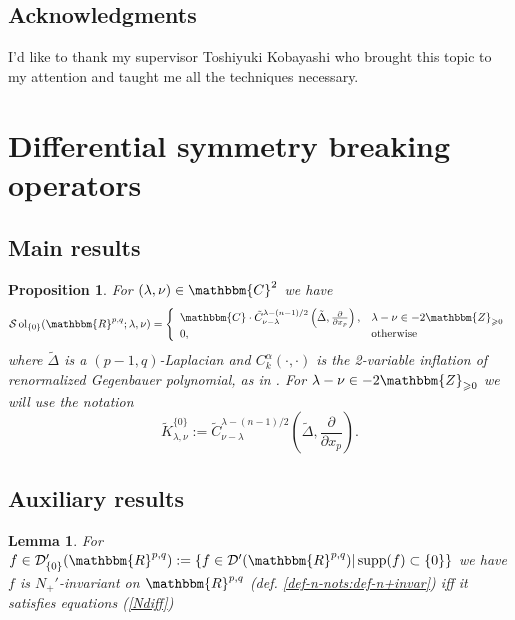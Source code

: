 \documentclass{article}
\newcommand{\assign}{:=}
\newcommand{\tmop}[1]{\ensuremath{\operatorname{#1}}}
\numberwithin{definition}{section}
\newtheorem{lemma}{Lemma}
\numberwithin{lemma}{section}
\newtheorem{proposition}{Proposition}
\numberwithin{proposition}{section}
{\theorembodyfont{\rmfamily}\newtheorem{remark}{Remark}
\numberwithin{remark}{section}
}
\begin{document}
\subsection{Acknowledgments}

I'd like to thank my supervisor Toshiyuki Kobayashi who brought this topic to
my attention and taught me all the techniques necessary.

\section{Differential symmetry breaking operators}\label{sec:diffSBO}

\subsection{Main results}

\begin{proposition}
  \label{diffSBO:prop-main}For $( \lambda, \nu) \in \mathbbm{C}^2$ we have
  \[ \mathcal{S} \tmop{ol}_{\{ 0 \}} ( \mathbbm{R}^{p, q} ; \lambda, \nu) =
     \left\{ \begin{array}{ll}
       \mathbbm{C} \cdot \tilde{C}_{\nu - \lambda}^{\lambda - ( n - 1) / 2}
       \left( \tilde{\Delta}, \frac{\partial}{\partial x_p} \right), & \lambda
       - \nu \in - 2\mathbbm{Z}_{\geqslant 0}\\
       0, & \tmop{otherwise}
     \end{array} \right. \]
  where $\tilde{\Delta}$ is a $( p - 1, q)$-Laplacian and $C^{\alpha}_k (
  \cdot, \cdot)$ is the 2-variable inflation of renormalized Gegenbauer
  polynomial, as in {\cite[(16.3)]{kobayashi2015symmetry}}. For $\lambda - \nu
  \in - 2\mathbbm{Z}_{\geqslant 0}$ we will use the notation
  \[ \tilde{K}_{\lambda, \nu}^{\{ 0 \}} \assign \tilde{C}_{\nu -
     \lambda}^{\lambda - ( n - 1) / 2} \left( \tilde{\Delta},
     \frac{\partial}{\partial x_p} \right) . \]
\end{proposition}

\subsection{Auxiliary results}

\begin{lemma}
  \label{diffSBO:lem-aux}For $f \in \mathcal{D}'_{\{ 0 \}} ( \mathbbm{R}^{p,
  q}) \assign \{ f \in \mathcal{D}' ( \mathbbm{R}^{p, q}) | \tmop{supp} ( f)
  \subset \{ 0 \} \}$ we have $f$ is $N_+'$-invariant on $\mathbbm{R}^{p, q}$
  (def. \ref{def-n-nots:def-n+invar}) iff it satisfies equations (\ref{Ndiff})
\end{lemma}
\end{document}
